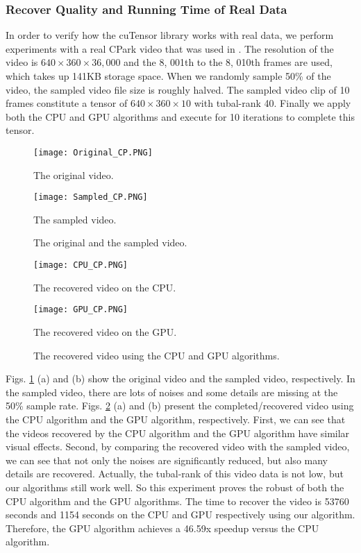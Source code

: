 \documentclass[format=acmsmall, review=false, screen=true]{acmart}
\begin{document}
\subsubsection{Recover Quality and Running Time of Real Data}
In order to verify how the cuTensor library works with real data, we perform experiments with a real CPark video \cite{CPark} that was used in \cite{XiaoYang2016Low}. The resolution of the video is $640 \times 360 \times 36,000$ and the 8, 001th to the 8, 010th frames are used, which takes up 141KB storage space. When we randomly sample 50\% of the video, the sampled video file size is roughly halved. The sampled video clip of 10 frames constitute a tensor of $640 \times 360 \times 10$ with tubal-rank 40. Finally we apply both the CPU and GPU algorithms and execute for 10 iterations to complete this tensor.
\begin{figure}[t]
  \centering
  \begin{minipage}[b]{0.4\linewidth}
    \texttt{[image: Original\_CP.PNG]}
    \caption{The original video.}
  \end{minipage}
  \begin{minipage}[b]{0.4\linewidth}
    \texttt{[image: Sampled\_CP.PNG]}
    \caption{The sampled video.}
  \end{minipage}
  \caption{The original and the sampled video.}
  \label{pic_original}
\end{figure}

\begin{figure}[t]
  \centering
  \begin{minipage}[b]{0.4\linewidth}
    \texttt{[image: CPU\_CP.PNG]}
    \caption{The recovered video on the CPU.}
  \end{minipage}
  \begin{minipage}[b]{0.4\linewidth}
    \texttt{[image: GPU\_CP.PNG]}
    \caption{The recovered video on the GPU.}
  \end{minipage}
  \caption{The recovered video using the CPU and GPU algorithms.}
  \label{pic_recovery}
\end{figure}


Figs. \ref{pic_original} (a) and (b) show the original video and the sampled video, respectively. In the sampled video, there are lots of noises and some details are missing at the 50\% sample rate. Figs. \ref{pic_recovery} (a) and (b) present the completed/recovered video using the CPU algorithm and the GPU algorithm, respectively. First, we can see that the videos recovered by the CPU algorithm and the GPU algorithm have similar visual effects. Second, by comparing the recovered video with the sampled video, we can see that not only the noises are significantly reduced, but also many details are recovered. Actually, the tubal-rank of this video data is not low, but our algorithms still work well. So this experiment proves the robust of both the CPU algorithm and the GPU algorithms. The time to recover the video is 53760 seconds and 1154 seconds on the CPU and GPU respectively using our algorithm. Therefore, the GPU algorithm achieves a 46.59x speedup versus the CPU algorithm.
\end{document}
